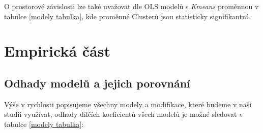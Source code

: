 \documentclass[11pt, a4paper]{article}
\begin{document}
O prostorové závislosti lze také uvažovat dle OLS modelů s \textit{Kmeans} proměnnou v tabulce \ref{modely tabulka}, kde proměnné Clusterů jsou statisticky signifikantní. 


\section{Empirická část}

\subsection{Odhady modelů a jejich porovnání}
Výše v  rychlosti popisujeme všechny modely a modifikace, které budeme v naši studii využívat, odhady dílčích koeficientů všech modelů je možné sledovat v tabulce \ref{modely tabulka}:
\end{document}
